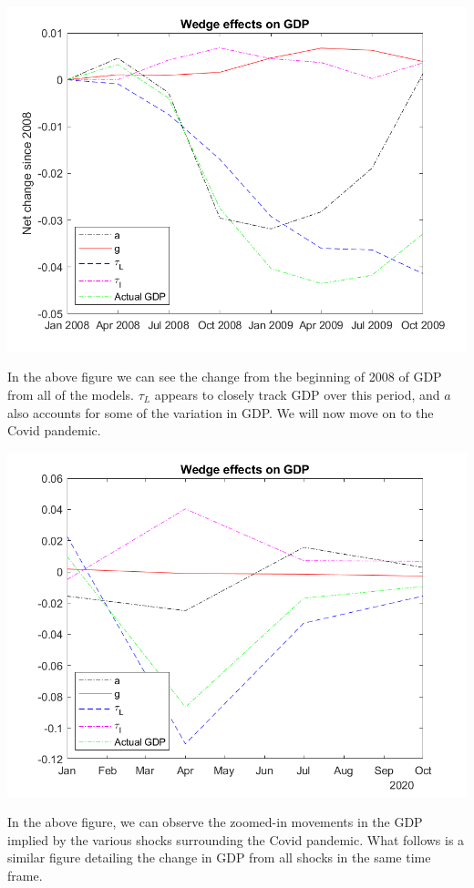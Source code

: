 \documentclass[11pt]{article} %
\begin{document}
\includegraphics{wedgesfindiff}

In the above figure we can see the change from the beginning of 2008 of GDP from all of the models. $\tau_L$ appears to closely track GDP over this period, and $a$ also accounts for some of the variation in GDP. We will now move on to the Covid pandemic.

\includegraphics{wedgescov}

In the above figure, we can observe the zoomed-in movements in the GDP implied by the various shocks surrounding the Covid pandemic. What follows is a similar figure detailing the change in GDP from all shocks in the same time frame.
\end{document}
